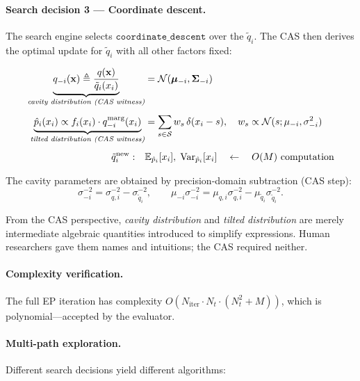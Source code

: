 \documentclass[12pt,a4paper]{article}
\newcommand{\bx}{\mathbf{x}}
\newcommand{\bmu}{\bm{\mu}}
\newcommand{\bSigma}{\bm{\Sigma}}
\newcommand{\calN}{\mathcal{N}}
\newcommand{\calS}{\mathcal{S}}
\newcommand{\Exp}{\mathbb{E}}
\newcommand{\Var}{\mathrm{Var}}
\begin{document}
\paragraph{Search decision 3 --- Coordinate descent.}
The search engine selects $\mathtt{coordinate\_descent}$ over the $\tilde{q}_i$.
The CAS then derives the optimal update for $\tilde{q}_i$
with all other factors fixed:

\begin{align}
  \underbrace{q_{-i}(\bx) \triangleq \frac{q(\bx)}{\tilde{q}_i(x_i)}}_{\text{\emph{cavity distribution (CAS witness)}}}
  &= \calN(\bmu_{-i},\bSigma_{-i})
  \label{eq:cavity}\\[4pt]
  \underbrace{\hat{p}_i(x_i) \propto f_i(x_i)\cdot q_{-i}^{\mathrm{marg}}(x_i)}_{\text{\emph{tilted distribution (CAS witness)}}}
  &= \sum_{s\in\calS} w_s\,\delta(x_i-s),\quad
  w_s \propto \calN(s;\mu_{-i},\sigma_{-i}^2)
  \label{eq:tilted}\\[4pt]
  \tilde{q}_i^\mathrm{new}:\quad
  &\Exp_{\hat{p}_i}[x_i],\;\Var_{\hat{p}_i}[x_i]
  \quad\leftarrow\quad O(M)\text{ computation}
  \label{eq:moments}
\end{align}

The cavity parameters are obtained by precision-domain subtraction (CAS step):
\begin{equation}
  \sigma_{-i}^{-2} = \sigma_{q,i}^{-2} - \sigma_{\tilde{q}_i}^{-2},\qquad
  \mu_{-i}\sigma_{-i}^{-2} = \mu_{q,i}\sigma_{q,i}^{-2} - \mu_{\tilde{q}_i}\sigma_{\tilde{q}_i}^{-2}.
  \label{eq:precision}
\end{equation}

\begin{tcolorbox}[insight]
  From the CAS perspective, \emph{cavity distribution} and
  \emph{tilted distribution} are merely intermediate algebraic quantities
  introduced to simplify expressions.  Human researchers gave them names and
  intuitions; the CAS required neither.
\end{tcolorbox}

\paragraph{Complexity verification.}
The full EP iteration has complexity $O(N_\text{iter}\cdot N_t\cdot(N_t^2+M))$,
which is polynomial---accepted by the evaluator.

\paragraph{Multi-path exploration.}
Different search decisions yield different algorithms:
\end{document}
